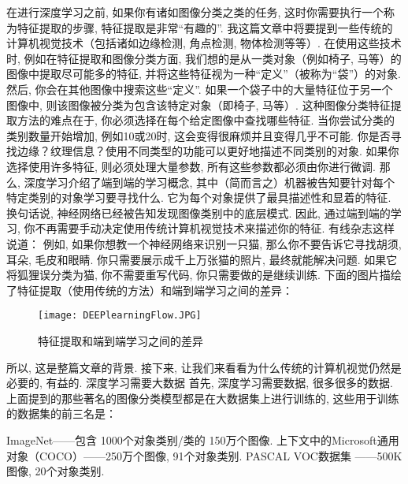 在进行深度学习之前, 如果你有诸如图像分类之类的任务, 这时你需要执行一个称为特征提取的步骤, 特征提取是非常“有趣的”. 我这篇文章中将要提到一些传统的计算机视觉技术（包括诸如边缘检测, 角点检测, 物体检测等等）.
在使用这些技术时, 例如在特征提取和图像分类方面, 我们想的是从一类对象（例如椅子, 马等）的图像中提取尽可能多的特征, 并将这些特征视为一种“定义”（被称为“袋”）的对象. 然后, 你会在其他图像中搜索这些“定义”. 如果一个袋子中的大量特征位于另一个图像中, 则该图像被分类为包含该特定对象（即椅子, 马等）.
这种图像分类特征提取方法的难点在于, 你必须选择在每个给定图像中查找哪些特征. 当你尝试分类的类别数量开始增加, 例如10或20时, 这会变得很麻烦并且变得几乎不可能. 你是否寻找边缘？纹理信息？使用不同类型的功能可以更好地描述不同类别的对象. 如果你选择使用许多特征, 则必须处理大量参数, 所有这些参数都必须由你进行微调.
那么, 深度学习介绍了端到端的学习概念, 其中（简而言之）机器被告知要针对每个特定类别的对象学习要寻找什么. 它为每个对象提供了最具描述性和显着的特征. 换句话说, 神经网络已经被告知发现图像类别中的底层模式.
因此, 通过端到端的学习, 你不再需要手动决定使用传统计算机视觉技术来描述你的特征. 有线杂志这样说道：
例如, 如果你想教一个神经网络来识别一只猫, 那么你不要告诉它寻找胡须, 耳朵, 毛皮和眼睛. 你只需要展示成千上万张猫的照片, 最终就能解决问题. 如果它将狐狸误分类为猫, 你不需要重写代码, 你只需要做的是继续训练.
下面的图片描绘了特征提取（使用传统的方法）和端到端学习之间的差异：
\begin{figure}[H]
\centering
\texttt{[image: DEEPlearningFlow.JPG]}
\caption{特征提取和端到端学习之间的差异}
\label{DEEPlearningFlow}
\vspace{-0.4cm}
\end{figure}
所以, 这是整篇文章的背景. 接下来, 让我们来看看为什么传统的计算机视觉仍然是必要的, 有益的. 深度学习需要大数据
首先, 深度学习需要数据, 很多很多的数据. 上面提到的那些著名的图像分类模型都是在大数据集上进行训练的, 这些用于训练的数据集的前三名是：

ImageNet——包含 1000个对象类别/类的 150万个图像.
上下文中的Microsoft通用对象（COCO）——250万个图像, 91个对象类别.
PASCAL VOC数据集 ——500K图像, 20个对象类别.

